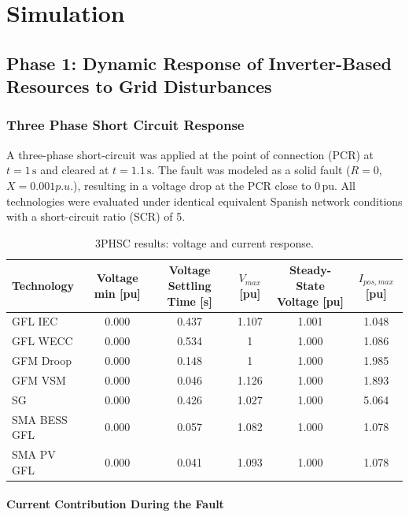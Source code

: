 \chapter{Simulation}
\label{ch:Simulation}

\section{Phase 1: Dynamic Response of Inverter-Based Resources to Grid Disturbances}
\subsection{Three Phase Short Circuit Response}

A three-phase short-circuit was applied at the point of connection (PCR) at $t = 1\,\text{s}$ and cleared at $t = 1.1\,\text{s}$. The fault was modeled as a solid fault ($R = 0$, $X = 0.001 p.u.$), resulting in a voltage drop at the PCR close to $0\,\text{pu}$. All technologies were evaluated under identical equivalent Spanish network conditions with a short-circuit ratio (SCR) of 5.

\begin{table}[htbp]
\centering
\footnotesize
\caption{3PHSC results: voltage and current response.}
\begin{tabular}{lccccc}
\toprule
Technology & Voltage min [pu] & Voltage Settling Time [s] & $V_{max}$ [pu] & Steady-State Voltage [pu] & $I_{pos,max}$ [pu] \\
\midrule
GFL IEC        & 0.000 & 0.437 & 1.107 & 1.001 & 1.048 \\
GFL WECC       & 0.000 & 0.534 & 1& 1.000 & 1.086 \\
GFM Droop      & 0.000 & 0.148 &1& 1.000 & 1.985 \\
GFM VSM        & 0.000 & 0.046 &1.126& 1.000 & 1.893 \\
SG              & 0.000 & 0.426 &1.027& 1.000 & 5.064 \\
SMA BESS GFL  & 0.000 & 0.057 & 1.082 & 1.000 & 1.078 \\
SMA PV GFL    & 0.000 & 0.041 & 1.093 & 1.000 & 1.078 \\
\bottomrule
\end{tabular}
\label{tab:3phsc_voltage_current}
\end{table}




\subsubsection{Current Contribution During the Fault}

